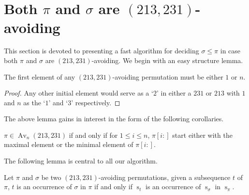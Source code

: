 \documentclass[a4paper]{llncs}
\DeclareMathOperator{\AV}{Av}
\DeclareMathOperator{\Avd}{Av}
\newcommand\Av[2]{\Avd_{{#1}}({#2})}
\newcommand{\ptext}{\pi}
\newcommand{\pmotif}{\sigma}
\DeclareMathOperator{\stripea}{s}
\newcommand{\stripe}[2]{\stripea_{{#1}}[{#2}]}
\newcommand{\stripew}[1]{\stripea_{{#1}}}
\newcommand{\dstep}{d}
\newcommand{\ustep}{a}
\begin{document}


\section{Both $\pi$ and $\sigma$ are $(213,231)$-avoiding}
\label{section:both are (231,213)-avoiding}

This section is devoted to presenting a fast algorithm for deciding
$\sigma \leq \pi$
in case both $\pi$ and $\sigma$ are $(213,231)$-avoiding.
We begin with an easy structure lemma.

\begin{lemma}[Folklore]
\label{lemma:first element is 1 or n}
The first element of any $(213,231)$-avoiding permutation
must be either $1$ or $n$.
\end{lemma}

\begin{proof}
Any other initial element would serve as a `$2$' in either a
$231$ or $213$ with $1$ and $n$ as the `$1$' and `$3$' respectively.
\end{proof}

The above lemma gains in interest in the form of the following corollaries.

\begin{corollary}
\label{corollary:minmaxelement}
$\pi \in \AV_n(213,231)$ if and only if for $1 \leq i \leq n$,
$\pi[i:]$ start either with the maximal element
or the minimal element of $\pi[i:]$.
\end{corollary}

%

The following lemma is central to all our algorithm.

\begin{lemma}
\label{lemma:MatchStripeToPermutation}
Let $\pi$ and $\sigma$ be two $(213,231)$-avoiding permutations, given a subsequence $t$ of $\ptext$, $t$ is an occurrence of $\pmotif$ in $\ptext$ if and only if $\stripew{t}$ is an occurrence of $\stripew{\pmotif}$ in $\stripew{\ptext}$.
\end{lemma}
\end{document}
